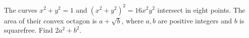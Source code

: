 The curves $x^2+y^2=1$ and $(x^2+y^2)^2=16x^2y^2$ intersect in eight points. The area of their convex octagon is $a+\sqrt b$, where $a,b$ are positive integers and $b$ is squarefree. Find $2a^2+b^2$.
